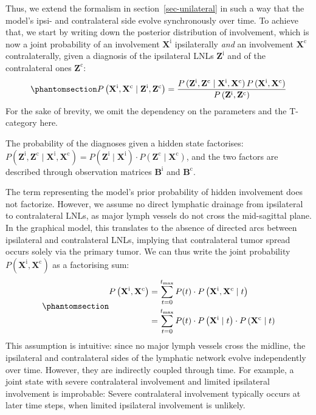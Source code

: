 \documentclass[
  sn-mathphys-num,
]{sn-jnl}
\begin{document}
Thus, we extend the formalism in section~\ref{sec-unilateral} in such a
way that the model's ipsi- and contralateral side evolve synchronously
over time. To achieve that, we start by writing down the posterior
distribution of involvement, which is now a joint probability of an
involvement \(\mathbf{X}^\text{i}\) ipsilaterally \emph{and} an
involvement \(\mathbf{X}^\text{c}\) contralaterally, given a diagnosis
of the ipsilateral LNLs \(\mathbf{Z}^\text{i}\) and of the contralateral
ones \(\mathbf{Z}^\text{c}\):
%
\begin{equation}\phantomsection\label{eq-bilateral-bayes}{
P \left( \mathbf{X}^\text{i}, \mathbf{X}^\text{c} \mid \mathbf{Z}^\text{i}, \mathbf{Z}^\text{c} \right) = \frac{P \left( \mathbf{Z}^\text{i}, \mathbf{Z}^\text{c} \mid \mathbf{X}^\text{i}, \mathbf{X}^\text{c} \right) P \left( \mathbf{X}^\text{i}, \mathbf{X}^\text{c} \right)}{P \left( \mathbf{Z}^\text{i}, \mathbf{Z}^\text{c} \right)}
}\end{equation}
%
For the sake of brevity, we omit the dependency on the parameters and
the T-category here.

The probability of the diagnoses given a hidden state factorises:
\(P \left( \mathbf{Z}^\text{i}, \mathbf{Z}^\text{c} \mid \mathbf{X}^\text{i}, \mathbf{X}^\text{c} \right) = P \left( \mathbf{Z}^\text{i} \mid \mathbf{X}^\text{i} \right) \cdot P \left( \mathbf{Z}^\text{c} \mid \mathbf{X}^\text{c} \right)\),
and the two factors are described through observation matrices
\(\mathbf{B}^\text{i}\) and \(\mathbf{B}^\text{c}\).

The term representing the model's prior probability of hidden
involvement does not factorize. However, we assume no direct lymphatic
drainage from ipsilateral to contralateral LNLs, as major lymph vessels
do not cross the mid-sagittal plane. In the graphical model, this
translates to the absence of directed arcs between ipsilateral and
contralateral LNLs, implying that contralateral tumor spread occurs
solely via the primary tumor. We can thus write the joint probability
\(P \left( \mathbf{X}^\text{i}, \mathbf{X}^\text{c} \right)\) as a
factorising sum:
%
\begin{equation}\phantomsection\label{eq-bilateral-marginal}{
\begin{aligned}
P \left( \mathbf{X}^\text{i}, \mathbf{X}^\text{c} \right) &= \sum_{t=0}^{t_\text{max}} P(t) \cdot P \left( \mathbf{X}^\text{i}, \mathbf{X}^\text{c} \mid t \right) \\
&= \sum_{t=0}^{t_\text{max}} P(t) \cdot P \left( \mathbf{X}^\text{i} \mid t \right) \cdot P \left( \mathbf{X}^\text{c} \mid t \right)
\end{aligned}
}\end{equation}
%
This assumption is intuitive: since no major lymph vessels cross the
midline, the ipsilateral and contralateral sides of the lymphatic
network evolve independently over time. However, they are indirectly
coupled through time. For example, a joint state with severe
contralateral involvement and limited ipsilateral involvement is
improbable: Severe contralateral involvement typically occurs at later
time steps, when limited ipsilateral involvement is unlikely.
\end{document}
